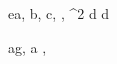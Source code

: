 \begin{eqcode}{e}{a, b, c}{, , ^2}{}
  d \in {} \lend
  d \gets {} \lend 
\end{eqcode}

\begin{eqcode}{a}{g, a }{, }{}
  
\end{eqcode}
